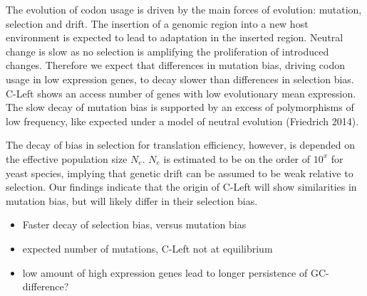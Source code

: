 \documentclass[12pt,draft]{article}
\begin{document}
The evolution of codon usage is driven by the main forces of evolution: mutation, selection and drift.
The insertion of a genomic region into a new host environment is expected to lead to adaptation in the inserted region.
Neutral change is slow as no selection is amplifying the proliferation of introduced changes.
Therefore we expect that differences in mutation bias, driving codon usage in low expression genes, to decay slower than differences in selection bias.
C-Left shows an access number of genes with low evolutionary mean expression.
The slow decay of mutation bias is supported by an excess of polymorphisms of low frequency, like expected under a model of neutral evolution (Friedrich 2014).

The decay of bias in selection for translation efficiency, however, is depended on the effective population size $N_e$.  
$N_e$ is estimated to be on the order of $10^x$ for yeast species, implying that genetic drift can be assumed to be weak relative to selection.
Our findings indicate that the origin of C-Left will show similarities in mutation bias, but will likely differ in their selection bias.


\begin{itemize}
	\item Faster decay of selection bias, versus mutation bias
	\item expected number of mutations, C-Left not at equilibrium
	\item low amount of high expression genes lead to longer persistence of GC-difference?
\end{itemize}
\end{document}
